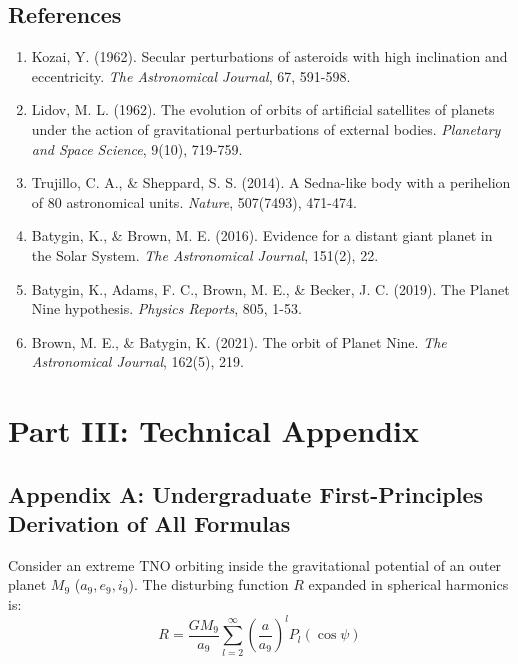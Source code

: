 \documentclass[11pt,a4paper]{article}
\begin{document}
\subsection*{References}
\begin{enumerate}
    \item Kozai, Y. (1962). Secular perturbations of asteroids with high inclination and eccentricity. \textit{The Astronomical Journal}, 67, 591-598.
    \item Lidov, M. L. (1962). The evolution of orbits of artificial satellites of planets under the action of gravitational perturbations of external bodies. \textit{Planetary and Space Science}, 9(10), 719-759.
    \item Trujillo, C. A., \& Sheppard, S. S. (2014). A Sedna-like body with a perihelion of 80 astronomical units. \textit{Nature}, 507(7493), 471-474.
    \item Batygin, K., \& Brown, M. E. (2016). Evidence for a distant giant planet in the Solar System. \textit{The Astronomical Journal}, 151(2), 22.
    \item Batygin, K., Adams, F. C., Brown, M. E., \& Becker, J. C. (2019). The Planet Nine hypothesis. \textit{Physics Reports}, 805, 1-53.
    \item Brown, M. E., \& Batygin, K. (2021). The orbit of Planet Nine. \textit{The Astronomical Journal}, 162(5), 219.
\end{enumerate}

\newpage

\section*{Part III: Technical Appendix}

\subsection*{Appendix A: Undergraduate First-Principles Derivation of All Formulas}

Consider an extreme TNO orbiting inside the gravitational potential of an outer planet $M_9$ ($a_9, e_9, i_9$). The disturbing function $R$ expanded in spherical harmonics is:
\begin{equation}
R = \frac{G M_9}{a_9} \sum_{l=2}^{\infty} \left( \frac{a}{a_9} \right)^l P_l(\cos \psi)
\end{equation}
\end{document}
